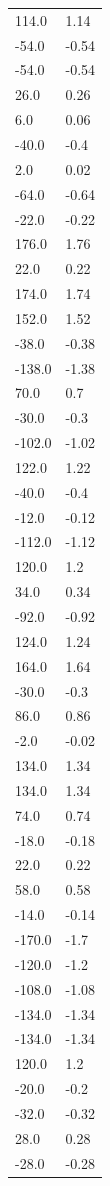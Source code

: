 \begin{longtable}{ll}
114.0 & 1.14 \\
-54.0 & -0.54 \\
-54.0 & -0.54 \\
26.0 & 0.26 \\
6.0 & 0.06 \\
-40.0 & -0.4 \\
2.0 & 0.02 \\
-64.0 & -0.64 \\
-22.0 & -0.22 \\
176.0 & 1.76 \\
22.0 & 0.22 \\
174.0 & 1.74 \\
152.0 & 1.52 \\
-38.0 & -0.38 \\
-138.0 & -1.38 \\
70.0 & 0.7 \\
-30.0 & -0.3 \\
-102.0 & -1.02 \\
122.0 & 1.22 \\
-40.0 & -0.4 \\
-12.0 & -0.12 \\
-112.0 & -1.12 \\
120.0 & 1.2 \\
34.0 & 0.34 \\
-92.0 & -0.92 \\
124.0 & 1.24 \\
164.0 & 1.64 \\
-30.0 & -0.3 \\
86.0 & 0.86 \\
-2.0 & -0.02 \\
134.0 & 1.34 \\
134.0 & 1.34 \\
74.0 & 0.74 \\
-18.0 & -0.18 \\
22.0 & 0.22 \\
58.0 & 0.58 \\
-14.0 & -0.14 \\
-170.0 & -1.7 \\
-120.0 & -1.2 \\
-108.0 & -1.08 \\
-134.0 & -1.34 \\
-134.0 & -1.34 \\
120.0 & 1.2 \\
-20.0 & -0.2 \\
-32.0 & -0.32 \\
28.0 & 0.28 \\
-28.0 & -0.28 \\

\end{longtable}
